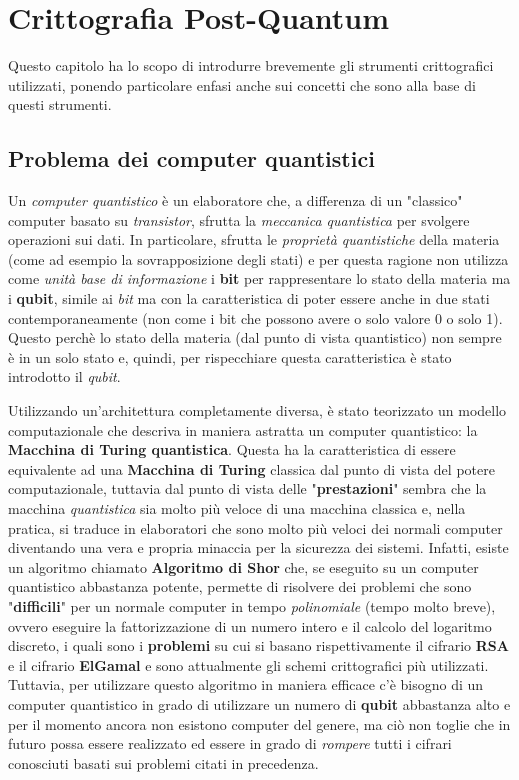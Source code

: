 \chapter{Crittografia Post-Quantum}

\begin{citazione}
    Questo capitolo ha lo scopo di introdurre brevemente gli strumenti crittografici utilizzati, ponendo particolare enfasi anche sui concetti che sono alla base di questi strumenti.
\end{citazione}

\section{Problema dei computer quantistici}
Un \emph{computer quantistico} è un elaboratore che, a differenza di un "classico" computer basato su \emph{transistor}, sfrutta la \emph{meccanica quantistica} per svolgere operazioni sui dati. In particolare, sfrutta le \emph{proprietà quantistiche} della materia (come ad esempio la sovrapposizione degli stati) e per questa ragione non utilizza come \emph{unità base di informazione} i \textbf{bit} per rappresentare lo stato della materia ma i \textbf{qubit}, simile ai \emph{bit} ma con la caratteristica di poter essere anche in due stati contemporaneamente (non come i bit che possono avere o solo valore 0 o solo 1). Questo perchè lo stato della materia (dal punto di vista quantistico) non sempre è in un solo stato e, quindi, per rispecchiare questa caratteristica è stato introdotto il \emph{qubit}. \cite{wikipedia_quantum_computing}

Utilizzando un'architettura completamente diversa, è stato teorizzato un modello computazionale che descriva in maniera astratta un computer quantistico: la \textbf{Macchina di Turing quantistica}. Questa ha la caratteristica di essere equivalente ad una \textbf{Macchina di Turing} classica dal punto di vista del potere computazionale, tuttavia dal punto di vista delle "\textbf{prestazioni}" sembra che la macchina \emph{quantistica} sia molto più veloce di una macchina classica e, nella pratica, si traduce in elaboratori che sono molto più veloci dei normali computer diventando una vera e propria minaccia per la sicurezza dei sistemi. Infatti, esiste un algoritmo chiamato \textbf{Algoritmo di Shor} che, se eseguito su un computer quantistico abbastanza potente, permette di risolvere dei problemi che sono "\textbf{difficili}" per un normale computer in tempo \emph{polinomiale} (tempo molto breve), ovvero eseguire la fattorizzazione di un numero intero e il calcolo del logaritmo discreto, i quali sono i \textbf{problemi} su cui si basano rispettivamente il cifrario \textbf{RSA} e il cifrario \textbf{ElGamal} e sono attualmente gli schemi crittografici più utilizzati. Tuttavia, per utilizzare questo algoritmo in maniera efficace c'è bisogno di un computer quantistico in grado di utilizzare un numero di \textbf{qubit} abbastanza alto e per il momento ancora non esistono computer del genere, ma ciò non toglie che in futuro possa essere realizzato ed essere in grado di \emph{rompere} tutti i cifrari conosciuti basati sui problemi citati in precedenza. \cite{wikipedia_quantum_computing}

